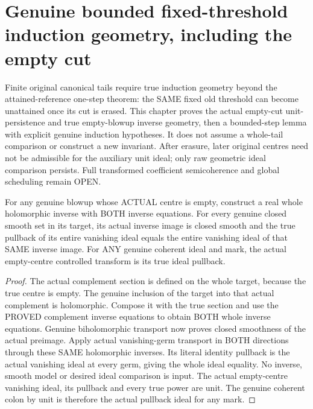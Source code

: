 \section{Genuine bounded fixed-threshold induction geometry, including the empty cut}

Finite original canonical tails require true induction geometry beyond the
attained-reference one-step theorem: the SAME fixed old threshold can become
unattained once its cut is erased. This chapter proves the actual empty-cut
unit-persistence and true empty-blowup inverse geometry, then a bounded-step
lemma with explicit genuine induction hypotheses. It does not assume a
whole-tail comparison or construct a new invariant. After erasure, later
original centres need not be admissible for the auxiliary unit ideal; only
raw geometric ideal comparison persists. Full transformed coefficient
semicoherence and global scheduling remain OPEN.

\begin{theorem}
\label{hir:original-empty-blowup-actual-inverse-smooth-ideal-transport}
\leanok
{}
For any genuine blowup whose ACTUAL centre is empty, construct a real whole
holomorphic inverse with BOTH inverse equations. For every genuine closed
smooth set in its target, its actual inverse image is closed smooth and the
true pullback of its entire vanishing ideal equals the entire vanishing ideal
of that SAME inverse image. For ANY genuine coherent ideal and mark, the
actual empty-centre controlled transform is its true ideal pullback.
\end{theorem}
\begin{proof}
The actual complement section is defined on the whole target, because the
true centre is empty. The genuine inclusion of the target into that actual
complement is holomorphic. Compose it with the true section and use the
PROVED complement inverse equations to obtain BOTH whole inverse equations.
Genuine biholomorphic transport now proves closed smoothness of the actual
preimage. Apply actual vanishing-germ transport in BOTH directions through
these SAME holomorphic inverses. Its literal identity pullback is the actual
vanishing ideal at every germ, giving the whole ideal equality. No inverse,
smooth model or desired ideal comparison is input. The actual empty-centre
vanishing ideal, its pullback and every true power are unit. The genuine
coherent colon by unit is therefore the actual pullback ideal for any mark.
\end{proof}

